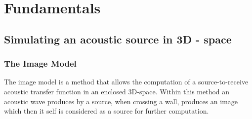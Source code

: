 \chapter{Fundamentals}
\label{chap:fundamentals}

\section{Simulating an acoustic source in 3D - space}
\subsection{The Image Model}
The image model is a method that allows the computation of a source-to-receive acoustic transfer function in an enclosed 3D-space. Within this method an acoustic wave produces by a source, when crossing a wall, produces an image which then it self is considered as a source for further computation.